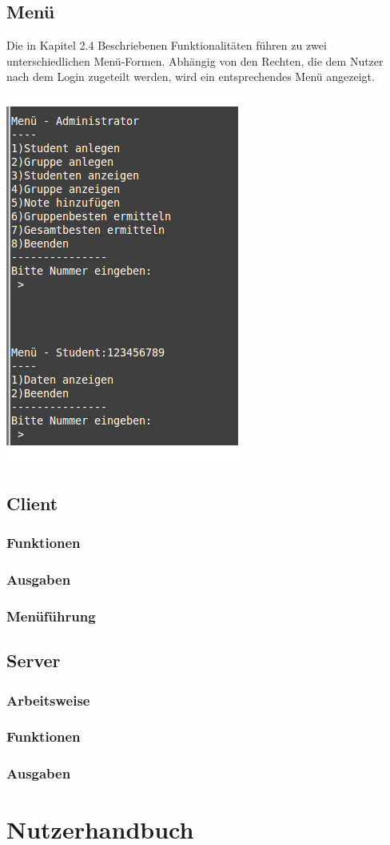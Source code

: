 \documentclass{scrartcl}
\begin{document}
	\subsection{Menü}
		Die in Kapitel 2.4 Beschriebenen Funktionalitäten führen zu zwei unterschiedlichen Menü-Formen. Abhängig von den Rechten, die dem Nutzer nach dem Login zugeteilt werden, wird ein entsprechendes Menü angezeigt.
		\begin{center}
		\includegraphics[scale=0.6]{menue.jpg}
		\end{center}
	\subsection{Client}
		\subsubsection{Funktionen}
		\subsubsection{Ausgaben}
		\subsubsection{Menüführung}
	\subsection{Server}
		\subsubsection{Arbeitsweise}
		\subsubsection{Funktionen}
		\subsubsection{Ausgaben}
\section{Nutzerhandbuch}
\end{document}

